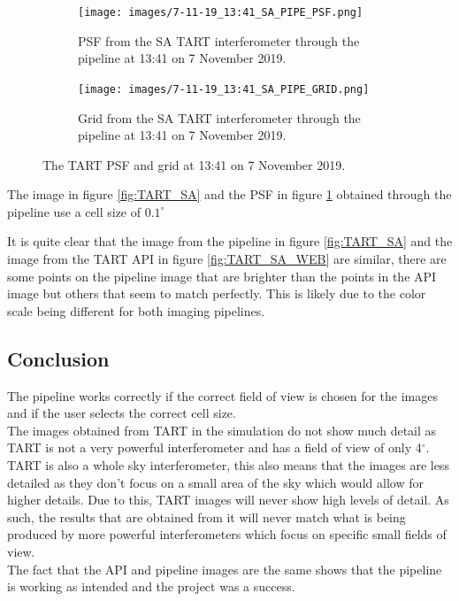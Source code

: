 \begin{figure}[H]
  \centering
  \begin{subfigure}[b]{0.49\textwidth}
    \centering 
    \texttt{[image: images/7-11-19\_13:41\_SA\_PIPE\_PSF.png]}
    \caption{PSF from the SA TART interferometer through the pipeline at 13:41 on 7 November 2019.}
    \label{fig:TART_SA_PSF}
  \end{subfigure}
  \begin{subfigure}[b]{0.49\textwidth}
 \centering
    \texttt{[image: images/7-11-19\_13:41\_SA\_PIPE\_GRID.png]}
    \caption{Grid from the SA TART interferometer through the pipeline at 13:41 on 7 November 2019.}
    \label{fig:TART_SA_GRID}
  \end{subfigure}
  \caption{The TART PSF and grid at 13:41 on 7 November 2019.}
  \label{fig:HERA-19}
\end{figure}

The image in figure \ref{fig:TART_SA} and the PSF in figure \ref{fig:TART_SA_PSF} obtained through the pipeline use a cell size of $0.1^\circ$

It is quite clear that the image from the pipeline in figure
\ref{fig:TART_SA} and the image from the TART API in figure \ref{fig:TART_SA_WEB} are similar, there are some points on the pipeline image that are brighter than the points in the API image but others that seem to match perfectly. This is likely due to the color scale being different for both imaging pipelines.
\FloatBarrier
\subsection{Conclusion}
The pipeline works correctly if the correct field of view is chosen for the images and if the user selects the correct cell size.\\
The images obtained from TART in the simulation do not show much detail as TART is not a very powerful interferometer and has a field of view of only 4$^\circ$.
TART is also a whole sky interferometer, this also means that the images are less detailed as they don't focus on a small area of the sky which would allow for higher details. Due to this, TART images will never show high levels of detail. 
As such, the results that are obtained from it will never match what is being produced by more powerful interferometers which focus on specific small fields of view. 
\\The fact that the API and pipeline images are the same shows that the pipeline is working as intended and the project was a success.

